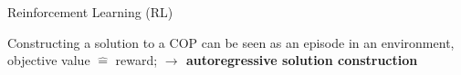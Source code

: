 \documentclass[aspectratio=1610]{beamer}
\newcommand{\important}[1]{{\color{green!60!black}#1}}
\renewcommand{\footnotesize}{\scriptsize}
\begin{document}
\begin{frame}{Reinforcement Learning (RL)}
\begin{itemize}
		\vspace{2ex}
		\important{Constructing a solution to a COP can be seen as an episode in an environment, objective value $\hat=$ reward;
		\textbf{$\rightarrow$ autoregressive solution construction}}
	\end{itemize}
\end{frame}





		
\end{document}
